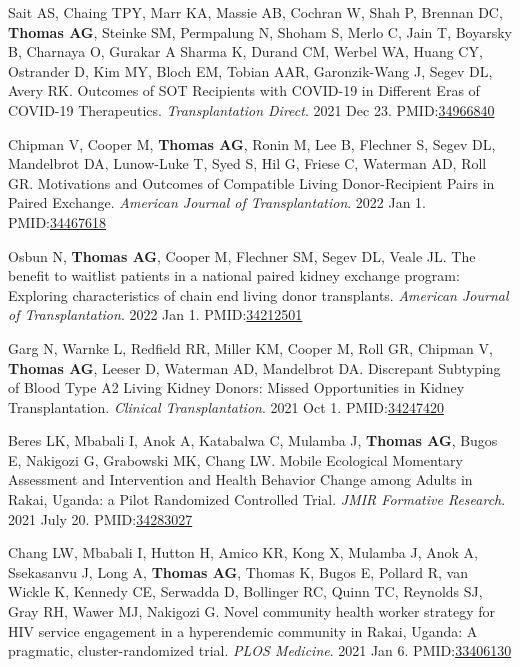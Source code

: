 \documentclass[10pt]{article}
\makeatletter
\newlength{\bibhang}
\newlength{\bibsep}
 {\@listi \global\bibsep\itemsep \global\advance\bibsep by\parsep}
\newenvironment{bibenum*}
  {\renewcommand\labelenumi{[\theenumi]}%
   \etaremune[
     topsep=0pt,
     itemsep=\bibsep,
     parsep=0pt,partopsep=0pt,
     itemindent=-\bibhang,
     leftmargin={\bibhang+\widthof{[999]}}]}
  {\endetaremune}
\newcommand{\pmid}[1]{PMID:\href{https://www.ncbi.nlm.nih.gov/pubmed/#1}{#1}}
\makeatother
\begin{document}
\begin{bibenum*}
\item Sait AS, Chaing TPY, Marr KA, Massie AB, Cochran W, 
  Shah P, Brennan DC, \textbf{Thomas AG}, Steinke SM, 
  Permpalung N, Shoham S, Merlo C, Jain T, Boyarsky B, 
  Charnaya O, Gurakar A Sharma K, Durand CM, Werbel WA,
  Huang CY, Ostrander D, Kim MY, Bloch EM, Tobian AAR,
  Garonzik-Wang J, Segev DL, Avery RK.
  Outcomes of SOT Recipients with COVID-19 in 
  Different Eras of COVID-19 Therapeutics.
  \emph{Transplantation Direct}. 2021 Dec 23.
  \pmid{34966840} 

\item Chipman V, Cooper M, \textbf{Thomas AG}, Ronin M,
  Lee B, Flechner S, Segev DL, Mandelbrot DA, Lunow-Luke T,
  Syed S, Hil G, Friese C, Waterman AD, Roll GR.
  Motivations and Outcomes of Compatible Living 
  Donor-Recipient Pairs in Paired Exchange.
  \emph{American Journal of Transplantation}. 2022 Jan 1.
  \pmid{34467618} 

\item Osbun N, \textbf{Thomas AG}, Cooper M, Flechner SM,
  Segev DL, Veale JL.
  The benefit to waitlist patients in a national paired kidney 
  exchange program: Exploring characteristics of chain end 
  living donor transplants.
  \emph{American Journal of Transplantation}. 2022 Jan 1.
  \pmid{34212501} 

\item Garg N, Warnke L, Redfield RR, Miller KM, Cooper M, Roll GR,
  Chipman V, \textbf{Thomas AG}, Leeser D, Waterman AD, 
  Mandelbrot DA. 
  Discrepant Subtyping of Blood Type A2 Living Kidney Donors: 
  Missed Opportunities in Kidney Transplantation.
  \emph{Clinical Transplantation}. 2021 Oct 1.
  \pmid{34247420} 

\item Beres LK, Mbabali I, Anok A, Katabalwa C,
  Mulamba J, \textbf{Thomas AG}, Bugos E, Nakigozi G,
  Grabowski MK, Chang LW.
  Mobile Ecological Momentary Assessment and Intervention 
  and Health Behavior Change among Adults in Rakai, 
  Uganda: a Pilot Randomized Controlled Trial.
  \emph{JMIR Formative Research}. 2021 July 20.
  \pmid{34283027} 

\item Chang LW, Mbabali I, Hutton H, Amico KR, Kong X, 
  Mulamba J, Anok A, Ssekasanvu J, Long A, \textbf{Thomas AG},
  Thomas K, Bugos E, Pollard R, van Wickle K, Kennedy CE,
  Serwadda D, Bollinger RC, Quinn TC, Reynolds SJ, Gray RH,
  Wawer MJ, Nakigozi G.
  Novel community health worker strategy for HIV service 
  engagement in a hyperendemic community in Rakai, Uganda: 
  A pragmatic, cluster-randomized trial.
  \emph{PLOS Medicine}. 2021 Jan 6.
  \pmid{33406130} 


\end{bibenum*}
\end{document}
